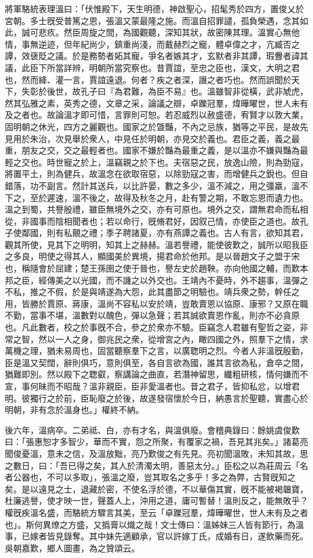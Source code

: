 \begin{pinyinscope}
將軍駱統表理溫曰：「伏惟殿下，天生明德，神啟聖心，招髦秀於四方，置俊乂於宮朝。多士旣受普篤之恩，張溫又蒙最隆之施。而溫自招罪譴，孤負榮遇，念其如此，誠可悲疚。然臣周旋之間，為國觀聽，深知其狀，故密陳其理。溫實心無他情，事無逆迹，但年紀尚少，鎮重尚淺，而戴赫烈之寵，體卓偉之才，亢臧否之譚，效襃貶之議。於是務勢者妬其寵，爭名者嫉其才，玄默者非其譚，瑕釁者諱其議，此臣下所當詳辨，明朝所當究察也。昔賈誼，至忠之臣也，漢文，大明之君也，然而絳、灌一言，賈誼遠退。何者？疾之者深，譖之者巧也。然而誤聞於天下，失彰於後世，故孔子曰『為君難，為臣不易』也。溫雖智非從橫，武非虓虎，然其弘雅之素，英秀之德，文章之采，論議之辯，卓躒冠羣，煒曄曜世，世人未有及之者也。故論溫才即可惜，言罪則可恕。若忍威烈以赦盛德，宥賢才以敦大業，固明朝之休光，四方之麗觀也。國家之於曁豔，不內之忌族，猶等之平民，是故先見用於朱治，次見舉於衆人，中見任於明朝，亦見交於義也。君臣之義，義之最重，朋友之交，交之最輕者也。國家不嫌於豔為最重之義，是以溫亦不嫌與豔為最輕之交也。時世寵之於上，溫竊親之於下也。夫宿惡之民，放逸山險，則為勁寇，將置平土，則為健兵，故溫念在欲取宿惡，以除勁寇之害，而增健兵之銳也。但自錯落，功不副言。然計其送兵，以比許晏，數之多少，溫不減之，用之彊羸，溫不下之，至於遲速，溫不後之，故得及秋冬之月，赴有警之期，不敢忘恩而遺力也。溫之到蜀，共譽殷禮，雖臣無境外之交，亦有可原也。境外之交，謂無君命而私相從，非國事而陰相聞者也；若以命行，旣脩君好，因叙己情，亦使臣之道也。故孔子使鄰國，則有私覿之禮；季子聘諸夏，亦有燕譚之義也。古人有言，欲知其君，觀其所使，見其下之明明，知其上之赫赫。溫若譽禮，能使彼歎之，誠所以昭我臣之多良，明使之得其人，顯國美於異境，揚君命於他邦。是以晉趙文子之盟于宋也，稱隨會於屈建；楚王孫圉之使于晉也，譽左史於趙鞅。亦向他國之輔，而歎本邦之臣，經傳美之以光國，而不譏之以外交也。王靖內不憂時，外不趨事，溫彈之不私，推之不假，於是與靖遂為大怨，此其盡節之明驗也。靖兵衆之勢，幹任之用，皆勝於賈原、蔣康，溫尚不容私以安於靖，豈敢賣恩以協原、康邪？又原在職不勤，當事不堪，溫數對以醜色，彈以急聲；若其誠欲賣恩作亂，則亦不必貪原也。凡此數者，校之於事旣不合，參之於衆亦不驗。臣竊念人君雖有聖哲之姿，非常之智，然以一人之身，御兆民之衆，從增宮之內，瞰四國之外，照羣下之情，求萬機之理，猶未易周也，固當聽察羣下之言，以廣聦明之烈。今者人非溫旣殷勤，臣是溫又契闊，辭則俱巧，意則俱至，各自言欲為國，誰其言欲為私，倉卒之間，猶難即別。然以殿下之聦叡，察講論之曲直，若潛神留思，纖粗研核，情何嫌而不宣，事何昧而不昭哉？溫非親臣，臣非愛溫者也。昔之君子，皆抑私忿，以增君明。彼獨行之於前，臣恥廢之於後，故遂發宿懷於今日，納愚言於聖聽，實盡心於明朝，非有念於溫身也。」權終不納。

後六年，溫病卒。二弟祗、白，亦有才名，與溫俱廢。會稽典錄曰：餘姚虞俊歎曰：「張惠恕才多智少，華而不實，怨之所聚，有覆家之禍，吾見其兆矣。」諸葛亮聞俊憂溫，意未之信，及溫放黜，亮乃歎俊之有先見。亮初聞溫敗，未知其故，思之數日，曰：「吾已得之矣，其人於清濁太明，善惡太分。」臣松之以為莊周云「名者公器也，不可以多取」，張溫之廢，豈其取名之多乎！多之為弊，古賢旣知之矣。是以遠見之士，退藏於密，不使名浮於德，不以華傷其實，旣不能被褐韞寶，杜廉逃譽，使才映一世，聲蓋人上，沖用之道，庸可暫替！溫則反之，能無敗乎？權旣疾溫名盛，而駱統方驟言其美，至云「卓躒冠羣，煒曄曜世，世人未有及之者也」。斯何異燎之方盛，又撝膏以熾之哉！文士傳曰：溫姊妹三人皆有節行，為溫事，已嫁者皆見錄奪。其中妹先適顧承，官以許嫁丁氏，成婚有日，遂飲藥而死。吳朝嘉歎，鄉人圖畫，為之贊頌云。


\end{pinyinscope}